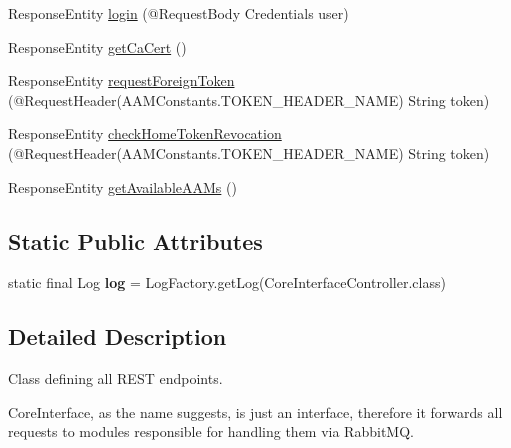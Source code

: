 \begin{DoxyCompactItemize}
\item 
Response\+Entity \hyperlink{classeu_1_1h2020_1_1symbiote_1_1controllers_1_1CoreInterfaceController_ae47382b47714db8cd0e659b30774355d}{login} (@Request\+Body Credentials user)
\item 
Response\+Entity \hyperlink{classeu_1_1h2020_1_1symbiote_1_1controllers_1_1CoreInterfaceController_aca68318d41a4eb6990ecb13e147653d2}{get\+Ca\+Cert} ()
\item 
Response\+Entity \hyperlink{classeu_1_1h2020_1_1symbiote_1_1controllers_1_1CoreInterfaceController_a779ecc60765fc72199347821fd462dae}{request\+Foreign\+Token} (@Request\+Header(A\+A\+M\+Constants.\+T\+O\+K\+E\+N\+\_\+\+H\+E\+A\+D\+E\+R\+\_\+\+N\+A\+ME) String token)
\item 
Response\+Entity \hyperlink{classeu_1_1h2020_1_1symbiote_1_1controllers_1_1CoreInterfaceController_ac07cffccf754e22b3eda120b9b8d0abf}{check\+Home\+Token\+Revocation} (@Request\+Header(A\+A\+M\+Constants.\+T\+O\+K\+E\+N\+\_\+\+H\+E\+A\+D\+E\+R\+\_\+\+N\+A\+ME) String token)
\item 
Response\+Entity \hyperlink{classeu_1_1h2020_1_1symbiote_1_1controllers_1_1CoreInterfaceController_a3b2da4979d936efcbc913770dfd2c0e3}{get\+Available\+A\+A\+Ms} ()
\end{DoxyCompactItemize}
\subsection*{Static Public Attributes}
\begin{DoxyCompactItemize}
\item 
\mbox{\label{classeu_1_1h2020_1_1symbiote_1_1controllers_1_1CoreInterfaceController_a38ded593a0e227a23d4f3a711d005cd2}} 
static final Log {\bfseries log} = Log\+Factory.\+get\+Log(Core\+Interface\+Controller.\+class)
\end{DoxyCompactItemize}


\subsection{Detailed Description}
Class defining all R\+E\+ST endpoints. 

Core\+Interface, as the name suggests, is just an interface, therefore it forwards all requests to modules responsible for handling them via Rabbit\+MQ. 

